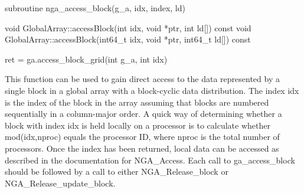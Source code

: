 \documentclass[12pt]{article}
\begin{document}
\begin{fapi}
\begin{fcode}
subroutine nga_access_block(g_a, idx, index, ld)
\end{fcode}
\begin{funcargs}
\end{funcargs}
\end{fapi}

\begin{cxxapi}
\begin{cxxcode}
void GlobalArray::accessBlock(int idx, void *ptr, int ld[]) const
void GlobalArray::accessBlock(int64_t idx, void *ptr, int64_t ld[]) const
\end{cxxcode}
\begin{funcargs}
\end{funcargs}
\end{cxxapi}

\begin{pyapi}
\begin{pycode}
ret = ga.access_block_grid(int g_a, int idx)
\end{pycode}
\begin{funcargs}
\end{funcargs}
\end{pyapi}

\local

\begin{desc}

This function can be used to gain direct access to the data represented by a
single block in a global array with a block-cyclic data distribution.  The
index idx is the index of the block in the array assuming that blocks are
numbered sequentially in a column-major order. A quick way of determining
whether a block with index idx is held locally on a processor is to calculate
whether mod(idx,nproc) equals the processor ID, where nproc is the total number
of processors. Once the index has been returned, local data can be accessed as
described in the documentation for NGA_Access. Each call to ga_access_block
should be followed by a call to either NGA_Release_block or
NGA_Release_update_block.

\end{desc}
\end{document}
